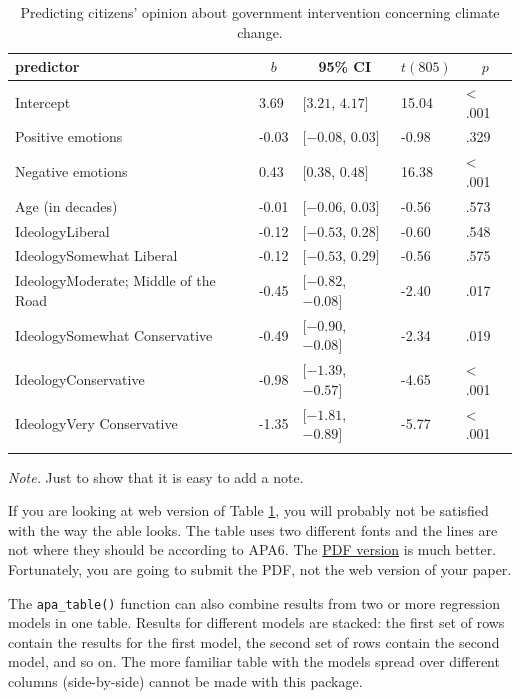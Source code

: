 \documentclass[doc,floatsintext]{apa6}
\begin{document}
\begin{table}[hbt]
\begin{center}
\begin{threeparttable}
\caption{\label{tab:papajatable}Predicting citizens' opinion about government 
          intervention concerning climate change.}
\small{
\begin{tabular}{lllll}
\toprule
predictor & \multicolumn{1}{c}{$b$} & \multicolumn{1}{c}{95\% CI} & \multicolumn{1}{c}{$t(805)$} & \multicolumn{1}{c}{$p$}\\
\midrule
Intercept & 3.69 & $[3.21$, $4.17]$ & 15.04 & < .001\\
Positive emotions & -0.03 & $[-0.08$, $0.03]$ & -0.98 & .329\\
Negative emotions & 0.43 & $[0.38$, $0.48]$ & 16.38 & < .001\\
Age (in decades) & -0.01 & $[-0.06$, $0.03]$ & -0.56 & .573\\
IdeologyLiberal & -0.12 & $[-0.53$, $0.28]$ & -0.60 & .548\\
IdeologySomewhat Liberal & -0.12 & $[-0.53$, $0.29]$ & -0.56 & .575\\
IdeologyModerate; Middle of the Road & -0.45 & $[-0.82$, $-0.08]$ & -2.40 & .017\\
IdeologySomewhat Conservative & -0.49 & $[-0.90$, $-0.08]$ & -2.34 & .019\\
IdeologyConservative & -0.98 & $[-1.39$, $-0.57]$ & -4.65 & < .001\\
IdeologyVery Conservative & -1.35 & $[-1.81$, $-0.89]$ & -5.77 & < .001\\
\bottomrule
\addlinespace
\end{tabular}
}
\begin{tablenotes}[para]
\normalsize{\textit{Note.} Just to show that it is easy to add a note.}
\end{tablenotes}
\end{threeparttable}
\end{center}
\end{table}

If you are looking at web version of Table \ref{tab:papajatable}, you
will probably not be satisfied with the way the able looks. The table
uses two different fonts and the lines are not where they should be
according to APA6. The \href{HelpMyCollaboratorUsesR.pdf}{PDF version}
is much better. Fortunately, you are going to submit the PDF, not the
web version of your paper.

The \texttt{apa\_table()} function can also combine results from two or
more regression models in one table. Results for different models are
stacked: the first set of rows contain the results for the first model,
the second set of rows contain the second model, and so on. The more
familiar table with the models spread over different columns
(side-by-side) cannot be made with this package.
\end{document}
